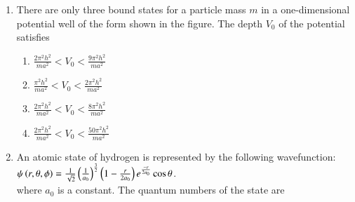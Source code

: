 \documentclass[journal]{IEEEtran}
\begin{document}
\begin{enumerate}[start=35]
\begin{multicols}{4}
    \begin{enumerate}
        \item $2i\hbar x^2$
        \item $-2i\hbar x^2$
        \item $3i\hbar x^2$
        \item $-3i\hbar x^2$
    \end{enumerate}
\end{multicols}
\item There are only three bound states for a particle mass $m$ in a one-dimensional potential well of the form shown in the figure. The depth $V_0$ of the potential satisfies
\begin{minipage}[t]{0.5\textwidth}
\raggedleft
{}
\end{minipage}
\begin{multicols}{2}
    \begin{enumerate}
        \item $\frac{2\pi^2 h^2}{ma^2}<V_0<\frac{9\pi^2 h^2}{ma^2}$
        \item $\frac{\pi^2 h^2}{ma^2}<V_0<\frac{2\pi^2 h^2}{ma^2}$
        \item $\frac{2\pi^2 h^2}{ma^2}<V_0<\frac{8\pi^2 h^2}{ma^2}$
        \item $\frac{2\pi^2 h^2}{ma^2}<V_0<\frac{50\pi^2 h^2}{ma^2}$
    \end{enumerate}
\end{multicols}
\item An atomic state of hydrogen is represented by the following wavefunction:\\
	$\psi\left(r,\theta,\phi\right)=\frac{1}{\sqrt{2}}\left(\frac{1}{a_0}\right)^{\frac{3}{2}}\left(1-\frac{r}{2a_0}\right)e^{\frac{-r}{2a_0}}\cos\theta$.\\ where $a_0$ is a constant. The quantum numbers of the state are
\begin{multicols}{2}

\end{multicols}
\end{enumerate}
\end{document}
